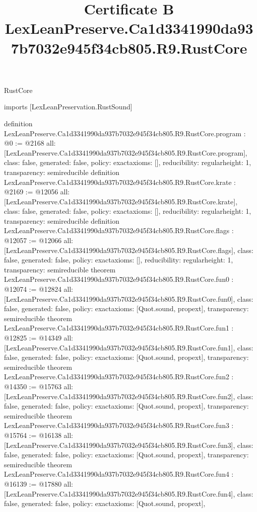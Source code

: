 \begin{lexlean}{RustCore}
\title{Certificate B LexLeanPreserve.Ca1d3341990da937b7032e945f34cb805.R9.RustCore}
\begin{coremodule}
imports [LexLeanPreservation.RustSound]

definition LexLeanPreserve.Ca1d3341990da937b7032e945f34cb805.R9.RustCore.program : @0 := @2168 {
  all: [LexLeanPreserve.Ca1d3341990da937b7032e945f34cb805.R9.RustCore.program],
  class: false,
  generated: false,
  policy: exact{axioms: []},
  reducibility: regular{height: 1},
  transparency: semireducible
}
definition LexLeanPreserve.Ca1d3341990da937b7032e945f34cb805.R9.RustCore.krate : @2169 := @12056 {
  all: [LexLeanPreserve.Ca1d3341990da937b7032e945f34cb805.R9.RustCore.krate],
  class: false,
  generated: false,
  policy: exact{axioms: []},
  reducibility: regular{height: 1},
  transparency: semireducible
}
definition LexLeanPreserve.Ca1d3341990da937b7032e945f34cb805.R9.RustCore.flags : @12057 := @12066 {
  all: [LexLeanPreserve.Ca1d3341990da937b7032e945f34cb805.R9.RustCore.flags],
  class: false,
  generated: false,
  policy: exact{axioms: []},
  reducibility: regular{height: 1},
  transparency: semireducible
}
theorem LexLeanPreserve.Ca1d3341990da937b7032e945f34cb805.R9.RustCore.fun0 : @12074 := @12824 {
  all: [LexLeanPreserve.Ca1d3341990da937b7032e945f34cb805.R9.RustCore.fun0],
  class: false,
  generated: false,
  policy: exact{axioms: [Quot.sound, propext]},
  transparency: semireducible
}
theorem LexLeanPreserve.Ca1d3341990da937b7032e945f34cb805.R9.RustCore.fun1 : @12825 := @14349 {
  all: [LexLeanPreserve.Ca1d3341990da937b7032e945f34cb805.R9.RustCore.fun1],
  class: false,
  generated: false,
  policy: exact{axioms: [Quot.sound, propext]},
  transparency: semireducible
}
theorem LexLeanPreserve.Ca1d3341990da937b7032e945f34cb805.R9.RustCore.fun2 : @14350 := @15763 {
  all: [LexLeanPreserve.Ca1d3341990da937b7032e945f34cb805.R9.RustCore.fun2],
  class: false,
  generated: false,
  policy: exact{axioms: [Quot.sound, propext]},
  transparency: semireducible
}
theorem LexLeanPreserve.Ca1d3341990da937b7032e945f34cb805.R9.RustCore.fun3 : @15764 := @16138 {
  all: [LexLeanPreserve.Ca1d3341990da937b7032e945f34cb805.R9.RustCore.fun3],
  class: false,
  generated: false,
  policy: exact{axioms: [Quot.sound, propext]},
  transparency: semireducible
}
theorem LexLeanPreserve.Ca1d3341990da937b7032e945f34cb805.R9.RustCore.fun4 : @16139 := @17880 {
  all: [LexLeanPreserve.Ca1d3341990da937b7032e945f34cb805.R9.RustCore.fun4],
  class: false,
  generated: false,
  policy: exact{axioms: [Quot.sound, propext]},
}
\end{coremodule}
\end{lexlean}
